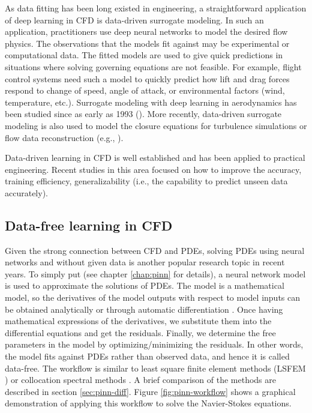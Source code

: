 As data fitting has been long existed in engineering, a straightforward application of deep learning in CFD is data-driven surrogate modeling.
In such an application, practitioners use deep neural networks to model the desired flow physics.
The observations that the models fit against may be experimental or computational data.
The fitted models are used to give quick predictions in situations where solving governing equations are not feasible.
For example, flight control systems need such a model to quickly predict how lift and drag forces respond to change of speed, angle of attack, or environmental factors (wind, temperature, etc.). 
Surrogate modeling with deep learning in aerodynamics has been studied since as early as 1993 (\cite{linse_identification_1993, faller_unsteady_1997}).
More recently, data-driven surrogate modeling is also used to model the closure equations for turbulence simulations or flow data reconstruction (e.g., \cite{Tracey2015,milano_neural_2002}).

Data-driven learning in CFD is well established and has been applied to practical engineering.
Recent studies in this area focused on how to improve the accuracy, training efficiency, generalizability (i.e., the capability to predict unseen data accurately).

\subsection*{Data-free learning in CFD}

Given the strong connection between CFD and PDEs, solving PDEs using neural networks and without given data is another popular research topic in recent years.
To simply put (see chapter \ref{chap:pinn} for details), a neural network model is used to approximate the solutions of PDEs.
The model is a mathematical model, so the derivatives of the model outputs with respect to model inputs can be obtained analytically or through automatic differentiation \cite{griewank_automatic_1988}.
Once having mathematical expressions of the derivatives, we substitute them into the differential equations and get the residuals. 
Finally, we determine the free parameters in the model by optimizing/minimizing the residuals.
In other words, the model fits against PDEs rather than observed data, and hence it is called data-free.
The workflow is similar to least square finite element methods (LSFEM \cite{jiang_least-squares_1998}) or collocation spectral methods \cite{trefethen_spectral_2000}.
A brief comparison of the methods are described in section \ref{sec:pinn-diff}.
Figure \ref{fig:pinn-workflow} shows a graphical demonstration of applying this workflow to solve the Navier-Stokes equations. 

